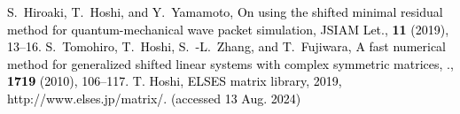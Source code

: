 


\textcolor{black}{
\fontsize{28pt}{15pt}\selectfont
\begin{thebibliography}{7}
	\vspace{-2mm}
		S.~Hiroaki, T.~Hoshi, and Y.~Yamamoto,
		 On using the shifted minimal residual method for quantum-mechanical wave packet simulation,
		JSIAM Let., \textbf{11} (2019), 13--16.
		S.~Tomohiro, T.~Hoshi, S.~-L.~Zhang, and T.~Fujiwara,
		A fast numerical method for generalized shifted linear systems with complex symmetric matrices,
		., \textbf{1719} (2010), 106--117.
		T. Hoshi, ELSES matrix library, 2019, http://www.elses.jp/matrix/. (accessed 13 Aug. 2024)
\end{thebibliography}
}


\begin{comment}




	\bibitem{ref-SeitoH-2019}
		S.~Hiroaki, T.~Hoshi, and Y.~Yamamoto,
		\newblock On using the shifted minimal residual method for quantum-mechanical wave packet simulation,
		\newblock JSIAM Let., {\bf 11} (2019), 13--16.
	\bibitem{ref-SogabeT-2010}
		S.~Tomohiro et.al.,
		\newblock A fast numerical method for generalized shifted linear systems with complex symmetric matrices,
		\newblock 数理解析研究所講究録., {\bf 1719} (2010), 106--117.


\end{comment}
